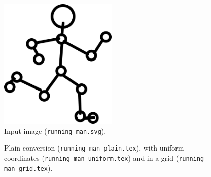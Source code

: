 \begin{figure}[H]
\centering
\includegraphics[width=0.5\textwidth]{running-man.pdf}
\caption{Input image (\texttt{running-man.svg}).}
\end{figure}

\begin{figure}[H]
\begin{minipage}{0.3\textwidth}
\begin{tikzpicture}

\end{tikzpicture}
\end{minipage}
\begin{minipage}{0.3\textwidth}
\begin{tikzpicture}

\end{tikzpicture}
\end{minipage}
\begin{minipage}{0.3\textwidth}
\begin{tikzpicture}

\end{tikzpicture}
\end{minipage}
\caption{Plain conversion (\texttt{running-man-plain.tex}), with uniform coordinates (\texttt{running-man-uniform.tex}) and in a grid (\texttt{running-man-grid.tex}).}
\end{figure}
